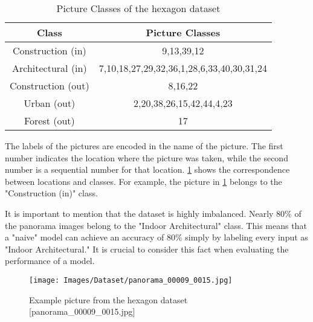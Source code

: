 \begin{table}
    \centering
    \begin{tabular}{cc}
    \toprule
    \textbf{Class}& \textbf{Picture Classes}\\ \midrule
    Construction (in) & 9,13,39,12 \\ \hline
    Architectural (in)& 7,10,18,27,29,32,36,1,28,6,33,40,30,31,24\\ \hline
    Construction (out)& 8,16,22\\ \hline
    Urban (out)& 2,20,38,26,15,42,44,4,23\\ \hline
    Forest (out)& 17\\
    \bottomrule
    \end{tabular}
    \caption{Picture Classes of the hexagon dataset
        \label{tab:dataset:piccoding}}
\end{table}

The labels of the pictures are encoded in the name of the picture. 
The first number indicates the location where the picture was taken, 
while the second number is a sequential number for that location. 
\cref{tab:dataset:piccoding} shows the correspondence between locations and classes. 
For example, the picture in \cref{fig:dataset:examplepic} belongs to the "Construction (in)" class.

It is important to mention that the dataset is highly imbalanced. 
Nearly 80\% of the panorama images belong to the "Indoor Architectural" class. 
This means that a "naive" model can achieve an accuracy of 80\% simply by labeling every input as "Indoor Architectural." 
It is crucial to consider this fact when evaluating the performance of a model.

\begin{figure}
    \centering
    \texttt{[image: Images/Dataset/panorama\_00009\_0015.jpg]}
    \caption{Example picture from the hexagon dataset [panorama\_00009\_0015.jpg]}
    \label{fig:dataset:examplepic}
\end{figure}

